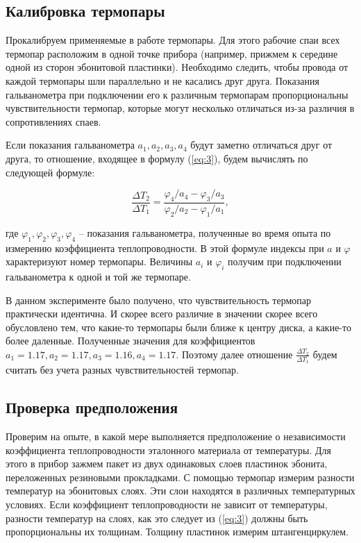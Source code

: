\documentclass[a4paper,11.5pt]{article} %
\begin{document}
\subsection{Калибровка термопары}

Прокалибруем применяемые в работе термопары. Для этого рабочие спаи всех термопар расположим в одной точке прибора (например, прижмем к середине одной из сторон эбонитовой пластинки). Необходимо следить, чтобы провода от каждой термопары шли параллельно и не касались друг друга. Показания гальванометра при подключении его к различным термопарам пропорциональны чувствительности термопар, которые могут несколько отличаться из-за различия в сопротивлениях спаев.

Если показания гальванометра $a_1, a_2, a_3, a_4$ будут заметно отличаться друг от друга, то отношение, входящее в формулу (\ref{eq:3}), будем вычислять по следующей формуле:

\begin{equation}
	\frac{\Delta T_2}{\Delta T_1} = \frac{\varphi_4/a_4 - \varphi_3/a_3}{\varphi_2/a_2 - \varphi_1/a_1},
	\label{eq:6}
\end{equation}

где $\varphi_1, \varphi_2, \varphi_3, \varphi_4$ -- показания гальванометра, полученные во время опыта по измерению коэффициента теплопроводности. В этой формуле индексы при $a$ и $\varphi$ характеризуют номер термопары. Величины $a_i$ и $\varphi_i$ получим при подключении гальванометра к одной и той же термопаре.

В данном эксперименте было получено, что чувствительность термопар практически идентична. И скорее всего различие в значении скорее всего обусловлено тем, что какие-то термопары были ближе к центру диска, а какие-то более даленные. Полученные значения для коэффициентов $a_1 = 1.17, a_2 = 1.17, a_3 = 1.16, a_4 = 1.17$. Поэтому далее отношение $\frac{\Delta T_2}{\Delta T_1}$ будем считать без учета разных чувствительностей термопар. 

\subsection{Проверка предположения}
Проверим на опыте, в какой мере выполняется предположение о независимости коэффициента теплопроводности эталонного материала от температуры. Для этого в прибор зажмем пакет из двух одинаковых слоев пластинок эбонита, переложенных резиновыми прокладками. С помощью термопар измерим разности температур на эбонитовых слоях. Эти слои находятся в различных температурных условиях. Если коэффициент теплопроводности не зависит от температуры, разности температур на слоях, как это следует из (\ref{eq:3}) должны быть пропорциональны их толщинам.  Толщину пластинок измерим штангенциркулем. 
\end{document}
